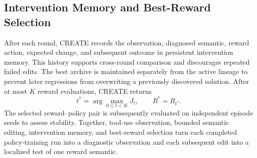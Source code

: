 \subsection{Intervention Memory and Best-Reward Selection}
After each round, CREATE records the observation, diagnosed semantic, reward action, expected change, and subsequent outcome in persistent intervention memory. This history supports cross-round comparison and discourages repeated failed edits. The best archive is maintained separately from the active lineage to prevent later regressions from overwriting a previously discovered solution. After at most $K$ reward evaluations, CREATE returns
\begin{equation}
t^*=\arg\max_{0\leq t<K}J_t,
\qquad R^*=R_{t^*}.
\label{eq:best_reward}
\end{equation}
The selected reward--policy pair is subsequently evaluated on independent episode seeds to assess stability. Together, tool-use observation, bounded semantic editing, intervention memory, and best-reward selection turn each completed policy-training run into a diagnostic observation and each subsequent edit into a localized test of one reward semantic.
